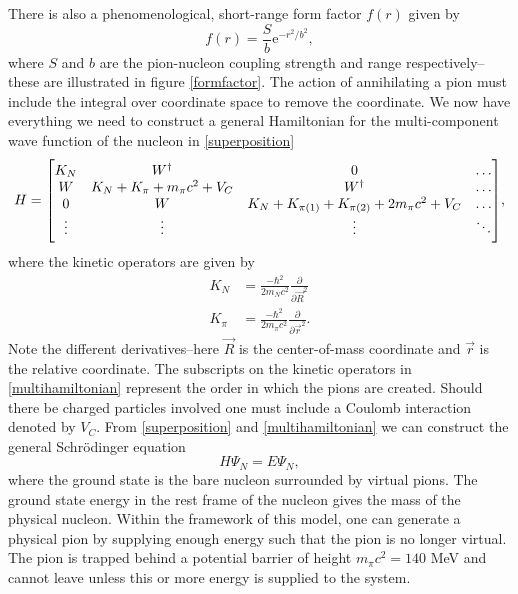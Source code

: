 There is also a phenomenological, short-range form factor $f(r)$ given by
\begin{equation}\label{formfactoreq}
	f(r) = \frac{S}{b} \text{e}^{-r^2/b^2},
\end{equation}
where $S$ and $b$ are the pion-nucleon coupling strength and range respectively--these are illustrated in figure \ref{formfactor}. The action of annihilating a pion must include the integral over coordinate space to remove the coordinate. We now have everything we need to construct a general Hamiltonian for the multi-component wave function of the nucleon in \eqref{superposition}
\begin{equation} \label{multihamiltonian}
	H = \mqty[K_N & W^\dagger & 0 &\ldots \\
	W & K_N+K_\pi+m_\pi c^2+V_C & W^\dagger & \ldots \\
	0 & W & K_N+K_{\pi(1)}+K_{\pi(2)}+2m_\pi c^2 +V_C & \ldots \\
	\vdots & \vdots & \vdots &\ddots ],
\end{equation}
where the kinetic operators are given by
\begin{align} \label{multiN}
	K_N &= \frac{-\hbar^2}{2 m_N c^2} \frac{\partial}{\partial \vec{R}^2} \\
	K_\pi &= \frac{-\hbar^2}{2 m_\pi c^2} \frac{\partial}{\partial \vec{r}^2}.
\end{align} 
Note the different derivatives--here $\vec{R}$ is the center-of-mass coordinate and $\vec{r}$ is the relative coordinate. The subscripts on the kinetic operators in \eqref{multihamiltonian} represent the order in which the pions are created. Should there be charged particles involved one must include a Coulomb interaction denoted by $V_C$. From \eqref{superposition} and \eqref{multihamiltonian} we can construct the general Schrödinger equation
\begin{equation} \label{MultiSE}
	H \Psi_N = E \Psi_N,
\end{equation}
where the ground state is the bare nucleon surrounded by virtual pions. The ground state energy in the rest frame of the nucleon gives the mass of the physical nucleon. Within the framework of this model, one can generate a physical pion by supplying enough energy such that the pion is no longer virtual. The pion is trapped behind a potential barrier of height $m_\pi c^2 = 140$ MeV and cannot leave unless this or more energy is supplied to the system.  
